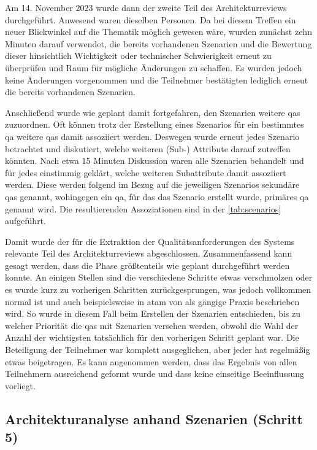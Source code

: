 Am 14. November 2023 wurde dann der zweite Teil des Architekturreviews durchgeführt.
Anwesend waren dieselben Personen.
Da bei diesem Treffen ein neuer Blickwinkel auf die Thematik möglich gewesen wäre, wurden zunächst zehn Minuten darauf verwendet, die bereits vorhandenen Szenarien und die Bewertung dieser hinsichtlich Wichtigkeit oder technischer Schwierigkeit erneut zu überprüfen und Raum für mögliche Änderungen zu schaffen.
Es wurden jedoch keine Änderungen vorgenommen und die Teilnehmer bestätigten lediglich erneut die bereits vorhandenen Szenarien.

Anschließend wurde wie geplant damit fortgefahren, den Szenarien weitere \glspl{qa} zuzuordnen.
Oft können trotz der Erstellung eines Szenarios für ein bestimmtes \gls{qa} weitere \glspl{qa} damit assoziiert werden.
Deswegen wurde erneut jedes Szenario betrachtet und diskutiert, welche weiteren (Sub-) Attribute darauf zutreffen könnten.
Nach etwa 15 Minuten Diskussion waren alle Szenarien behandelt und für jedes einstimmig geklärt, welche weiteren Subattribute damit assoziiert werden.
Diese werden folgend im Bezug auf die jeweiligen Szenarios sekundäre \glspl{qa} genannt, wohingegen ein \gls{qa}, für das das Szenario erstellt wurde, primäres \gls{qa} genannt wird.
Die resultierenden Assoziationen sind in der \cref{tab:scenarios} aufgeführt.



Damit wurde der für die Extraktion der Qualitätsanforderungen des Systems relevante Teil des Architekturreviews abgeschlossen.
Zusammenfassend kann gesagt werden, dass die Phase größtenteils wie geplant durchgeführt werden konnte.
An einigen Stellen sind die verschiedene Schritte etwas verschmolzen oder es wurde kurz zu vorherigen Schritten zurückgesprungen, was jedoch vollkommen normal ist und auch beispielsweise in \gls{atam} von  als gängige Praxis beschrieben wird.
So wurde in diesem Fall beim Erstellen der Szenarien entschieden, bis zu welcher Priorität die \glspl{qa} mit Szenarien versehen werden, obwohl die Wahl der Anzahl der wichtigsten tatsächlich für den vorherigen Schritt geplant war.
Die Beteiligung der Teilnehmer war komplett ausgeglichen, aber jeder hat regelmäßig etwas beigetragen.
Es kann angenommen werden, dass das Ergebnis von allen Teilnehmern ausreichend geformt wurde und dass keine einseitige Beeinflussung vorliegt.

\subsection{Architekturanalyse anhand Szenarien (Schritt 5)}

